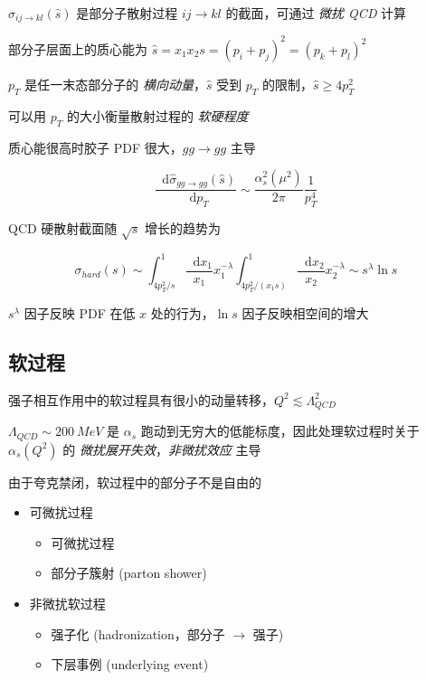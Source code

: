\documentclass[oneside,a4paper,openany,11pt]{ctexbook}
\newcommand*{\dif}{\mathop{}\!\mathrm{d}} %
\begin{document}
$\hat{\sigma}_{ij \to kl}(\hat{s})$ 是部分子散射过程 $ij \to kl$ 的截面，可通过 \emph{微扰 QCD} 计算

部分子层面上的质心能为 $\hat{s} = x_1 x_2 s = (p_i+p_j)^2 = (p_k+p_l)^2$

$p_T$ 是任一末态部分子的 \emph{横向动量}，$\hat{s}$ 受到 $p_T$ 的限制，$\hat{s} \ge 4 p_T^2$

可以用 $p_T$ 的大小衡量散射过程的 \emph{软硬程度}

质心能很高时胶子 PDF 很大，$gg \to gg$ 主导

\begin{equation}
    \frac{\dif\hat{\sigma}_{gg \to gg}(\hat{s})}{\dif p_T} \sim \frac{\alpha_s^2(\mu^2)}{2\pi}  \frac{1}{p_T^4}
\end{equation}

QCD 硬散射截面随 $\sqrt{s}$ 增长的趋势为

\begin{equation}
    \sigma_{hard}(s) \sim \int_{4 p_T^2/s}^1 \frac{\dif x_1}{x_1} x_1^{-\lambda} \int_{4 p_T^2/(x_1 s)}^1 \frac{\dif x_2}{x_2} x_2^{-\lambda} \sim s^\lambda \ln s
\end{equation}

$s^\lambda$ 因子反映 PDF 在低 $x$ 处的行为，$\ln s$ 因子反映相空间的增大

\subsection{软过程}

强子相互作用中的软过程具有很小的动量转移，$Q^2 \lesssim \Lambda^2_{QCD}$

$\Lambda_{QCD} \sim 200\ MeV$ 是 $\alpha_s$ 跑动到无穷大的低能标度，因此处理软过程时关于 $\alpha_s(Q^2)$ 的 \emph{微扰展开失效}，\emph{非微扰效应} 主导

由于夸克禁闭，软过程中的部分子不是自由的

\begin{itemize}
    \item 可微扰过程
        \begin{itemize}
            \item 可微扰过程
            \item 部分子簇射 (parton shower)
        \end{itemize}
    \item 非微扰软过程
        \begin{itemize}
            \item 强子化 (hadronization，部分子 $\to$ 强子)
            \item 下层事例 (underlying event)
        \end{itemize}
\end{itemize}
\end{document}
